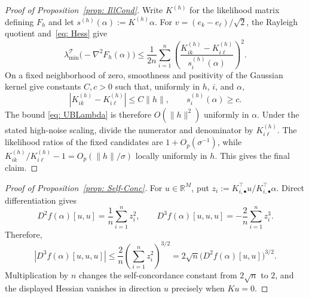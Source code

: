 \documentclass[12pt]{iopart}
\theoremstyle{remark}
\begin{document}
\begin{proof}[Proof of Proposition~\ref{prop: IllCond}]
Write $K^{(h)}$ for the likelihood matrix defining $F_h$ and let 
$s^{(h)}(\alpha):=K^{(h)}\alpha$.
For $v=(e_k-e_\ell)/\sqrt2$, the Rayleigh quotient and~\eqref{eq: Hess}
give
\begin{equation}
\label{eq: UBLambda}
\lambda_{\min}^{\mathcal T}\!\bigl(-\nabla^2F_h(\alpha)\bigr)
\leq\frac1{2n}\sum_{i=1}^n
\left(\frac{K^{(h)}_{ik}-K^{(h)}_{i\ell}}
{s_i^{(h)}(\alpha)}\right)^2.
\end{equation}
On a fixed neighborhood of zero, smoothness and positivity of the Gaussian
kernel give constants $C,c>0$ such that, uniformly in $h$, $i$, and $\alpha$,
\[
|K^{(h)}_{ik}-K^{(h)}_{i\ell}|\leq C\|h\|,
\qquad s_i^{(h)}(\alpha)\geq c.
\]
The bound \eqref{eq: UBLambda} is therefore $O(\|h\|^2)$ uniformly in $\alpha$.
Under the stated high-noise scaling, divide the numerator and denominator by
$K^{(h)}_{i\ell}$. The likelihood ratios of the fixed candidates are
$1+O_p(\sigma^{-1})$, while
$K^{(h)}_{ik}/K^{(h)}_{i\ell}-1=O_p(\|h\|/\sigma)$ locally uniformly in $h$.
This gives the final claim.
\end{proof}


\begin{proof}[Proof of Proposition~\ref{prop: Self-Conc}]
For $u\in\mathbb R^M$, put
\(
z_i:= K_{i,\bullet}^\top u / K_{i,\bullet}^\top\alpha.
\)
Direct differentiation gives
\[
D^2f(\alpha)[u,u]=\frac1n\sum_{i=1}^n z_i^2,
\qquad
D^3f(\alpha)[u,u,u]=-
\frac2n\sum_{i=1}^n z_i^3.
\]
Therefore,
\[
|D^3f(\alpha)[u,u,u]|
\leq
\frac2n\left(\sum_{i=1}^n z_i^2\right)^{3/2}
=2\sqrt n\bigl(D^2f(\alpha)[u,u]\bigr)^{3/2}.
\]
Multiplication by $n$ changes the self-concordance constant from
$2\sqrt n$ to $2$, and the displayed Hessian vanishes in direction $u$
precisely when $Ku=0$.
\end{proof}
\end{document}
